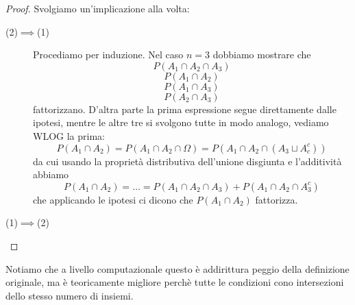 \documentclass[11pt]{scrartcl}
\begin{document}
	\begin{proof}
		Svolgiamo un'implicazione alla volta:
		\begin{description}
			\item[(2)$\implies$(1)] Procediamo per induzione. Nel caso $n=3$ dobbiamo mostrare che 
			$$P(A_1\cap A_2 \cap A_3)$$
			$$P(A_1\cap A_2)$$
			$$P(A_1\cap A_3)$$
			$$P(A_2\cap A_3)$$
			fattorizzano. D'altra parte la prima espressione segue direttamente dalle ipotesi, mentre le altre tre si svolgono tutte in modo analogo, vediamo WLOG la prima:
			$$P(A_1\cap A_2)=P(A_1\cap A_2\cap \Omega)=P(A_1\cap A_2 \cap (A_3\sqcup A_c^c))$$
			da cui usando la proprietà distributiva dell'unione disgiunta e l'additività abbiamo
			$$P(A_1\cap A_2)=\dots=P(A_1\cap A_2\cap A_3)+P(A_1\cap A_2\cap A_3^c)$$
			che applicando le ipotesi ci dicono che $P(A_1\cap A_2)$ fattorizza.
			\item[(1)$\implies$(2)]
		\end{description}
		
	\end{proof}
	Notiamo che a livello computazionale questo è addirittura peggio della definizione originale, ma è teoricamente migliore perchè tutte le condizioni cono intersezioni dello stesso numero di insiemi.
	
\end{document}
